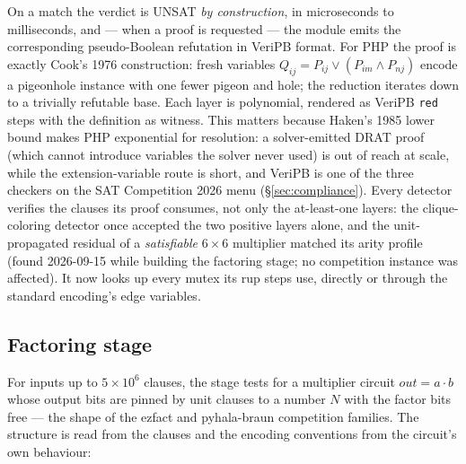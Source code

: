 \documentclass[10pt]{article}
\begin{document}
On a match the verdict is UNSAT \emph{by construction}, in
microseconds to milliseconds, and --- when a proof is requested ---
the module emits the corresponding pseudo-Boolean refutation in VeriPB
format. For PHP the proof is exactly Cook's 1976 construction: fresh
variables $Q_{ij} = P_{ij} \lor (P_{im} \land P_{nj})$ encode a
pigeonhole instance with one fewer pigeon and hole; the reduction
iterates down to a trivially refutable base. Each layer is polynomial,
rendered as VeriPB \texttt{red} steps with the definition as witness.
This matters because Haken's 1985 lower bound makes PHP exponential
for resolution: a solver-emitted DRAT proof (which cannot introduce
variables the solver never used) is out of reach at scale, while the
extension-variable route is short, and VeriPB is one of the three
checkers on the SAT Competition 2026 menu
(\S\ref{sec:compliance}). Every detector verifies the clauses its
proof consumes, not only the at-least-one layers: the clique-coloring
detector once accepted the two positive layers alone, and the
unit-propagated residual of a \emph{satisfiable} $6\times 6$
multiplier matched its arity profile (found 2026-09-15 while building
the factoring stage; no competition instance was affected). It now
looks up every mutex its rup steps use, directly or through the
standard encoding's edge variables.

\subsection{Factoring stage}
\label{sec:factoring}

For inputs up to $5\times 10^6$ clauses, the stage tests for a
multiplier circuit $\mathit{out} = a \cdot b$ whose output bits are
pinned by unit clauses to a number $N$ with the factor bits free --- the
shape of the ezfact and pyhala-braun competition families. The structure
is read from the clauses and the encoding conventions from the circuit's
own behaviour:
\end{document}
